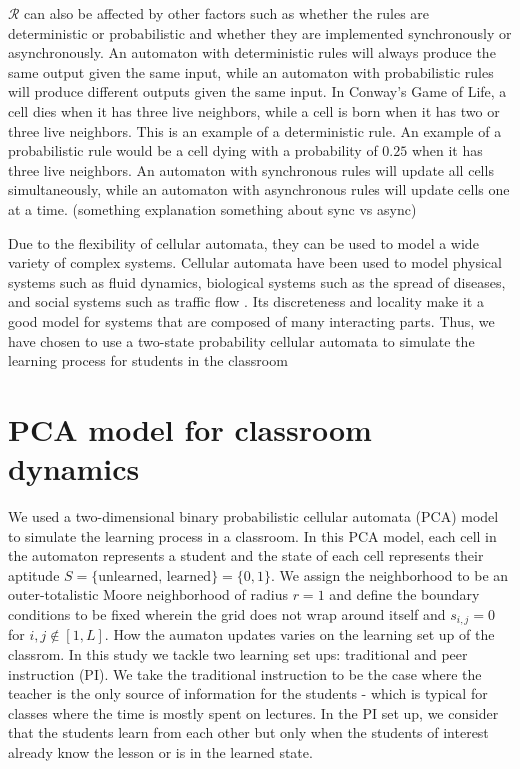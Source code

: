 $\mathcal{R}$ can also be affected by other factors such as whether the rules are deterministic or probabilistic and whether they are implemented synchronously or asynchronously. An automaton with deterministic rules will always produce the same output given the same input, while an automaton with probabilistic rules will produce different outputs given the same input. In Conway's Game of Life, a cell dies when it has three live neighbors, while a cell is born when it has two or three live neighbors. This is an example of a deterministic rule. An example of a probabilistic rule would be a cell dying with a probability of $0.25$ when it has three live neighbors. An automaton with synchronous rules will update all cells simultaneously, while an automaton with asynchronous rules will update cells one at a time. (something explanation something about sync vs async)


Due to the flexibility of cellular automata, they can be used to model a wide variety of complex systems. Cellular automata have been used to model physical systems such as fluid dynamics, biological systems such as the spread of diseases, and social systems such as traffic flow \cite{louis2018probabilistic}. Its discreteness and locality make it a good model for systems that are composed of many interacting parts. Thus, we have chosen to use a two-state probability cellular automata to simulate the learning process for students in the classroom


\section{PCA model for classroom dynamics}
We used a two-dimensional binary probabilistic cellular automata (PCA) model to simulate the learning process in a classroom. 
In this PCA model, each cell in the automaton represents a student and the state of each cell represents their aptitude $S=\lbrace\text{unlearned, learned}\rbrace=\lbrace 0,1 \rbrace$. 
We assign the neighborhood to be an outer-totalistic Moore neighborhood of radius $r=1$ and define the boundary conditions to be fixed wherein the grid does not wrap around itself and $s_{i,j} = 0$ for ${i,j \notin [1,L]}$. 
How the aumaton updates varies on the learning set up of the classrom. In this study we tackle two learning set ups: traditional and peer instruction (PI). 
We take the traditional instruction to be the case where the teacher is the only source of information for the students - which is typical for classes where the time is mostly spent on lectures. 
In the PI set up, we consider that the students learn from each other but only when the students of interest already know the lesson or is in the learned state.

